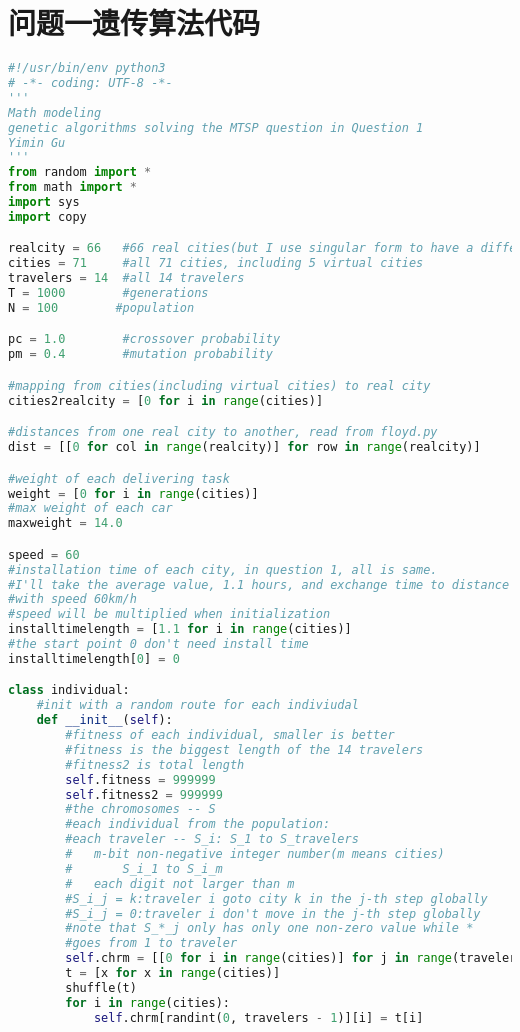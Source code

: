 \documentclass[UTF8,cs4size]{ctexart}
\begin{document}
\section{问题一遗传算法代码} \label{code:ga}
\begin{lstlisting}[language=Python]
#!/usr/bin/env python3
# -*- coding: UTF-8 -*-
'''
Math modeling
genetic algorithms solving the MTSP question in Question 1
Yimin Gu
'''
from random import *
from math import *
import sys
import copy

realcity = 66   #66 real cities(but I use singular form to have a difference)
cities = 71     #all 71 cities, including 5 virtual cities
travelers = 14  #all 14 travelers
T = 1000        #generations
N = 100        #population

pc = 1.0        #crossover probability
pm = 0.4        #mutation probability

#mapping from cities(including virtual cities) to real city
cities2realcity = [0 for i in range(cities)]

#distances from one real city to another, read from floyd.py
dist = [[0 for col in range(realcity)] for row in range(realcity)]

#weight of each delivering task
weight = [0 for i in range(cities)]
#max weight of each car
maxweight = 14.0

speed = 60
#installation time of each city, in question 1, all is same.
#I'll take the average value, 1.1 hours, and exchange time to distance
#with speed 60km/h
#speed will be multiplied when initialization
installtimelength = [1.1 for i in range(cities)]
#the start point 0 don't need install time
installtimelength[0] = 0

class individual:
    #init with a random route for each indiviudal
    def __init__(self):
        #fitness of each individual, smaller is better
        #fitness is the biggest length of the 14 travelers
        #fitness2 is total length
        self.fitness = 999999
        self.fitness2 = 999999
        #the chromosomes -- S
        #each individual from the population:
        #each traveler -- S_i: S_1 to S_travelers
        #   m-bit non-negative integer number(m means cities)
        #       S_i_1 to S_i_m
        #   each digit not larger than m
        #S_i_j = k:traveler i goto city k in the j-th step globally
        #S_i_j = 0:traveler i don't move in the j-th step globally
        #note that S_*_j only has only one non-zero value while *
        #goes from 1 to traveler
        self.chrm = [[0 for i in range(cities)] for j in range(travelers)] 
        t = [x for x in range(cities)]
        shuffle(t)
        for i in range(cities):
            self.chrm[randint(0, travelers - 1)][i] = t[i]


\end{lstlisting}
\end{document}
